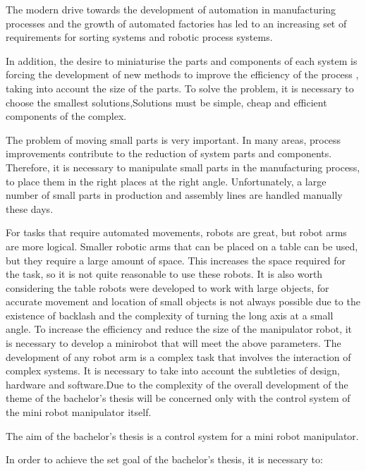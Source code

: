 



The modern drive towards the development of automation in manufacturing
 processes and the growth of automated factories has led to an increasing 
 set of requirements for sorting systems and robotic process systems. 

 In addition, the desire to miniaturise the parts and components of each system is 
 forcing the development of new methods to improve the efficiency of the process
 , taking into account the size of the parts. To solve the problem, it is necessary 
 to choose the smallest solutions,Solutions must be simple, cheap and efficient components of 
 the complex.

 The problem of moving small parts is very important.
 In many areas, process improvements contribute to the reduction of system parts and components.
Therefore, it is necessary to manipulate small parts in the manufacturing process, to place them in the right places at the right angle. Unfortunately, a large number of small parts in production and assembly lines are handled manually these days.

For tasks that require automated movements, robots are great, but robot arms are more logical. Smaller robotic arms that can be placed on a table can be used, but they require a large amount of space. This increases the space required for the task, so it is not quite reasonable to use these robots. It is also worth considering the table robots were developed to work with large objects, for accurate movement and location of small objects is not always possible due to the existence of backlash and the complexity of turning the long axis at a small angle. To increase the efficiency and reduce the size of the manipulator robot, it is necessary to develop a minirobot that will meet the above parameters.
The development of any robot arm is a complex task that involves the interaction of complex systems. It is necessary to take into account the subtleties of design, hardware and software.Due to the complexity of the overall development of the theme of the bachelor's thesis will be concerned only with the control system of the mini robot manipulator itself.

The aim of the bachelor's thesis is a control system for a mini robot manipulator. 

In order to achieve the set goal of the bachelor's thesis, it is necessary to:

